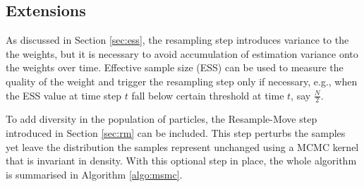 \subsection{Extensions}
As discussed in Section \ref{sec:ess}, the resampling step introduces variance to the the weights, but it is necessary to avoid accumulation of estimation variance onto the weights over time. Effective sample size (ESS) can be used to measure the quality of the weight and trigger the resampling step only if necessary, e.g., 
when the ESS value at time step $t$ fall below certain threshold at time $t$, say $\frac{N}{2}$.

To add diversity in the population of particles, the Resample-Move step introduced in Section \ref{sec:rm} can be included. This step perturbs the samples yet leave the distribution the samples represent unchanged using a MCMC kernel that is invariant in density. With this optional step in place, the whole algorithm is summarised in Algorithm \ref{algo:msmc}.

